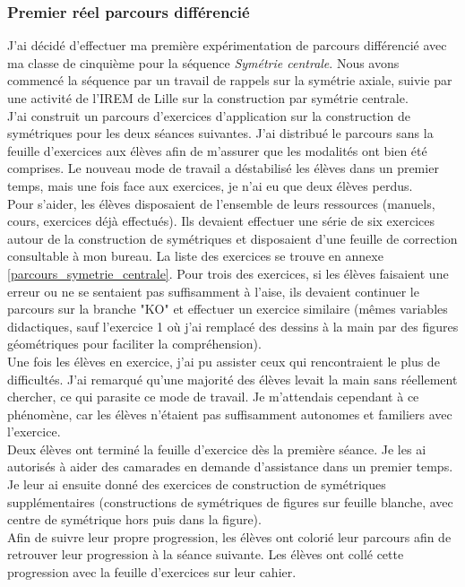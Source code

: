 \subsubsection{Premier réel parcours différencié}
J'ai décidé d'effectuer ma première expérimentation de parcours différencié avec ma classe de cinquième pour la séquence \emph{Symétrie centrale}. Nous avons commencé la séquence par un travail de rappels sur la symétrie axiale, suivie par une activité de l'IREM de Lille sur la construction par symétrie centrale.\\
J'ai construit un parcours d'exercices d'application sur la construction de symétriques pour les deux séances suivantes. J'ai distribué le parcours sans la feuille d'exercices aux élèves afin de m'assurer que les modalités ont bien été comprises. Le nouveau mode de travail a déstabilisé les élèves dans un premier temps, mais une fois face aux exercices, je n'ai eu que deux élèves perdus.\\
Pour s'aider, les élèves disposaient de l'ensemble de leurs ressources (manuels, cours, exercices déjà effectués). Ils devaient effectuer une série de six exercices autour de la construction de symétriques et disposaient d'une feuille de correction consultable à mon bureau. La liste des exercices se trouve en annexe \ref{parcours_symetrie_centrale}. Pour trois des exercices, si les élèves faisaient une erreur ou ne se sentaient pas suffisamment à l'aise, ils devaient continuer le parcours sur la branche "KO" et effectuer un exercice similaire (mêmes variables didactiques, sauf l'exercice 1 où j'ai remplacé des dessins à la main par des figures géométriques pour faciliter la compréhension).\\
Une fois les élèves en exercice, j'ai pu assister ceux qui rencontraient le plus de difficultés. J'ai remarqué qu'une majorité des élèves levait la main sans réellement chercher, ce qui parasite ce mode de travail. Je m'attendais cependant à ce phénomène, car les élèves n'étaient pas suffisamment autonomes et familiers avec l'exercice.\\
Deux élèves ont terminé la feuille d'exercice dès la première séance. Je les ai autorisés à aider des camarades en demande d'assistance dans un premier temps. Je leur ai ensuite donné des exercices de construction de symétriques supplémentaires (constructions de symétriques de figures sur feuille blanche, avec centre de symétrique hors puis dans la figure).\\
Afin de suivre leur propre progression, les élèves ont colorié leur parcours afin de retrouver leur progression à la séance suivante. Les élèves ont collé cette progression avec la feuille d'exercices sur leur cahier.\\
